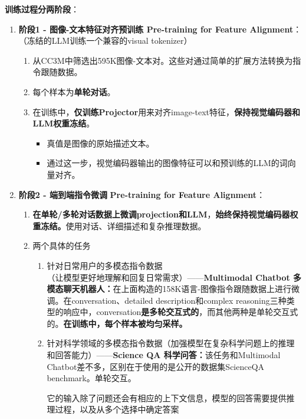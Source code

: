 \documentclass[zihao=false,fontset=windows]{ctexart}
\begin{document}
\begin{feishusoft}
\textbf{训练过程分两阶段}：\par
\end{feishusoft}
\begin{enumerate}
\item \textcolor{feishuRed}{\textbf{阶段1 - 图像-文本特征对齐预训练 Pre-training for Feature Alignment}}：\textcolor{feishuBlue}{（冻结的LLM训练一个兼容的visual tokenizer）}
\begin{enumerate}
\item 从CC3M中筛选出595K图像-文本对。这些对通过简单的扩展方法转换为指令跟随数据。
\item 每个样本为\textbf{单轮对话}。
\item 在训练中，\textcolor{feishuRed}{\textbf{仅训练Projector}}用来对齐image-text特征，\textbf{保持视觉编码器和LLM权重冻结}。
\begin{itemize}
\item 真值是图像的原始描述文本。
\item 通过这一步，视觉编码器输出的图像特征可以和预训练的LLM的词向量对齐。
\end{itemize}
\end{enumerate}
\item \textcolor{feishuRed}{\textbf{阶段2 - 端到端指令微调}} \textcolor{feishuRed}{\textbf{Pre-training for Feature Alignment}}：
\begin{enumerate}
\item \textbf{在单轮/多轮对话数据上}\textcolor{feishuRed}{\textbf{微调projection和LLM}}，\textbf{始终保持视觉编码器权重冻结。}使用对话、详细描述和复杂推理数据。
\item 两个具体的任务
\begin{enumerate}
\item 针对日常用户的多模态指令数据\textcolor{feishuBlue}{（让模型更好地理解和回复日常需求）}——\textbf{Multimodal Chatbot 多模态聊天机器人：}在上面构造的158K语言-图像指令跟随数据上进行微调。在conversation、detailed description和complex reasoning三种类型的响应中，conversation\textbf{是多轮交互式的}，而其他两种是单轮交互式的。\textbf{在训练中，每个样本被均匀采样。}
\item 针对科学领域的多模态指令数据\textcolor{feishuBlue}{（加强模型在复杂科学问题上的推理和回答能力）}——\textbf{Science QA 科学问答：}该任务和Multimodal Chatbot差不多，区别在于使用的是公开的数据集ScienceQA benchmark。单轮交互。
\begin{feishuquote}
它的输入除了问题还会有相应的上下文信息，模型的回答需要提供推理过程，以及从多个选择中确定答案\par
\end{feishuquote}
\end{enumerate}
\end{enumerate}
\end{enumerate}
\end{document}
